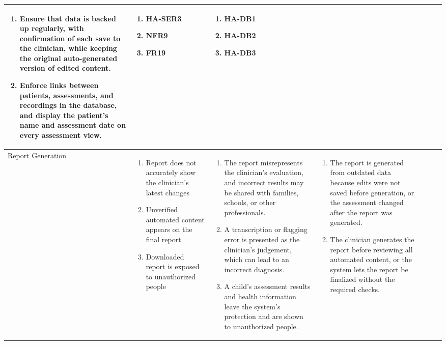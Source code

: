 \documentclass{article}
\begin{document}
\begin{landscape}
\begin{longtable}{|p{2.4cm}|p{3.2cm}|p{4cm}|p{3.6cm}|p{4.8cm}|p{1.8cm}|p{2.2cm}|}
\begin{enumerate}[leftmargin=*]
       \item Ensure that data is backed up regularly, with confirmation of each save to the clinician, while keeping the original auto-generated version of edited content.
       \item Enforce links between patients, assessments, and recordings in the database, and display the patient's name and assessment date on every assessment view.
  \end{enumerate} &
  \begin{enumerate}[leftmargin=*]
       \item HA-SER3
       \item NFR9
       \item FR19
  \end{enumerate} &
  \begin{enumerate}[leftmargin=*]
       \item HA-DB1
       \item HA-DB2
       \item HA-DB3
  \end{enumerate} \\
  \hline
  Report Generation &
  \begin{enumerate}[leftmargin=*]
      \item Report does not accurately show the clinician's latest changes
      \item Unverified automated content appears on the final report
      \item Downloaded report is exposed to unauthorized people
  \end{enumerate} &
  \begin{enumerate}[leftmargin=*]
      \item The report misrepresents the clinician's evaluation, and incorrect results may be shared with families, schools, or other professionals.
      \item A transcription or flagging error is presented as the clinician's judgement, which can lead to an incorrect diagnosis.
      \item A child's assessment results and health information leave the system's protection and are shown to unauthorized people.
  \end{enumerate} &
  \begin{enumerate}[leftmargin=*]
       \item The report is generated from outdated data because edits were not saved before generation, or the assessment changed after the report was generated.
       \item The clinician generates the report before reviewing all automated content, or the system lets the report be finalized without the required checks.

\end{enumerate}
\end{longtable}
\end{landscape}
\end{document}
